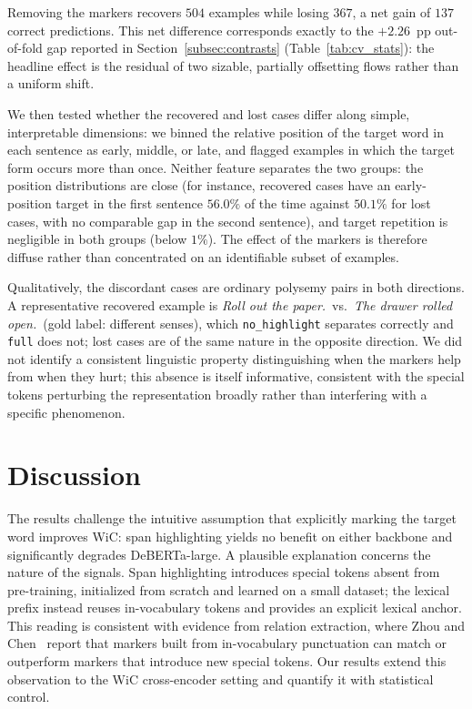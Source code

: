 \documentclass[runningheads]{llncs}
\begin{document}
Removing the markers recovers $504$ examples while losing $367$, a net gain of
$137$ correct predictions. This net difference corresponds exactly to the
$+2.26$~pp out-of-fold gap reported in Section~\ref{subsec:contrasts}
(Table~\ref{tab:cv_stats}): the headline effect is the residual of two sizable,
partially offsetting flows rather than a uniform shift.

We then tested whether the recovered and lost cases differ along simple,
interpretable dimensions: we binned the relative position of the target word in
each sentence as early, middle, or late, and flagged examples in which the
target form occurs more than once. Neither feature separates the two groups: the
position distributions are close (for instance, recovered cases have an
early-position target in the first sentence $56.0\%$ of the time against
$50.1\%$ for lost cases, with no comparable gap in the second sentence), and
target repetition is negligible in both groups (below $1\%$). The effect of the
markers is therefore diffuse rather than concentrated on an identifiable subset
of examples.

Qualitatively, the discordant cases are ordinary polysemy pairs in both
directions. A representative recovered example is \emph{Roll out the paper.}\
vs.\ \emph{The drawer rolled open.}\ (gold label: different senses), which
\texttt{no\_highlight} separates correctly and \texttt{full} does not; lost
cases are of the same nature in the opposite direction. We did not identify a
consistent linguistic property distinguishing when the markers help from when
they hurt; this absence is itself informative, consistent with the special
tokens perturbing the representation broadly rather than interfering with a
specific phenomenon.

\section{Discussion}
\label{sec:discussion}

The results challenge the intuitive assumption that explicitly marking the
target word improves WiC: span highlighting yields no benefit on either backbone
and significantly degrades DeBERTa-large. A plausible explanation concerns the
nature of the signals. Span highlighting introduces special tokens absent from
pre-training, initialized from scratch and learned on a small dataset; the
lexical prefix instead reuses in-vocabulary tokens and provides an explicit
lexical anchor. This reading is consistent with evidence from relation
extraction, where Zhou and Chen~\cite{zhou2022improved} report that markers
built from in-vocabulary punctuation can match or outperform markers that
introduce new special tokens. Our results extend this observation to the WiC
cross-encoder setting and quantify it with statistical control.
\end{document}
